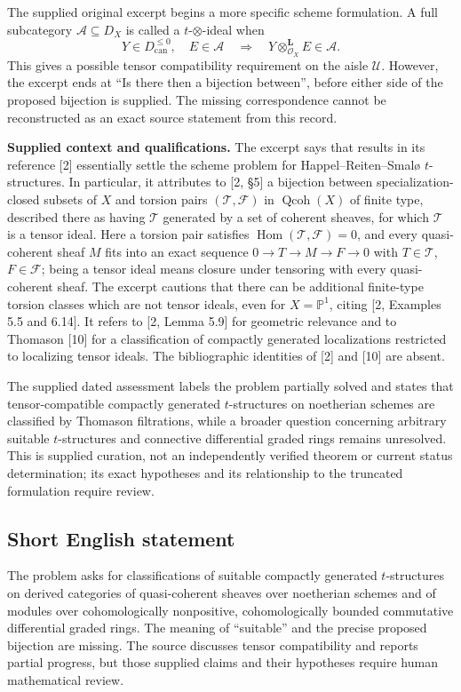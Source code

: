 \documentclass[11pt]{article}
\begin{document}
The supplied original excerpt begins a more specific scheme formulation. A full subcategory \(\mathcal A\subseteq D_X\) is called a \(t\)-\(\otimes\)-ideal when
\[
Y\in D_{\mathrm{can}}^{\leq 0},\quad E\in\mathcal A
\quad\Longrightarrow\quad
Y\otimes_{\mathcal O_X}^{\mathbf L}E\in\mathcal A.
\]
This gives a possible tensor compatibility requirement on the aisle \(\mathcal U\). However, the excerpt ends at ``Is there then a bijection between'', before either side of the proposed bijection is supplied. The missing correspondence cannot be reconstructed as an exact source statement from this record.

\textbf{Supplied context and qualifications.} The excerpt says that results in its reference [2] essentially settle the scheme problem for Happel--Reiten--Smal\o{} \(t\)-structures. In particular, it attributes to [2, \S5] a bijection between specialization-closed subsets of \(X\) and torsion pairs \((\mathcal T,\mathcal F)\) in \(\operatorname{Qcoh}(X)\) of finite type, described there as having \(\mathcal T\) generated by a set of coherent sheaves, for which \(\mathcal T\) is a tensor ideal. Here a torsion pair satisfies \(\operatorname{Hom}(\mathcal T,\mathcal F)=0\), and every quasi-coherent sheaf \(M\) fits into an exact sequence \(0\to T\to M\to F\to0\) with \(T\in\mathcal T\), \(F\in\mathcal F\); being a tensor ideal means closure under tensoring with every quasi-coherent sheaf. The excerpt cautions that there can be additional finite-type torsion classes which are not tensor ideals, even for \(X=\mathbb P^1\), citing [2, Examples 5.5 and 6.14]. It refers to [2, Lemma 5.9] for geometric relevance and to Thomason [10] for a classification of compactly generated localizations restricted to localizing tensor ideals. The bibliographic identities of [2] and [10] are absent.

The supplied dated assessment labels the problem partially solved and states that tensor-compatible compactly generated \(t\)-structures on noetherian schemes are classified by Thomason filtrations, while a broader question concerning arbitrary suitable \(t\)-structures and connective differential graded rings remains unresolved. This is supplied curation, not an independently verified theorem or current status determination; its exact hypotheses and its relationship to the truncated formulation require review.
\subsection{Short English statement}
The problem asks for classifications of suitable compactly generated \(t\)-structures on derived categories of quasi-coherent sheaves over noetherian schemes and of modules over cohomologically nonpositive, cohomologically bounded commutative differential graded rings. The meaning of ``suitable'' and the precise proposed bijection are missing. The source discusses tensor compatibility and reports partial progress, but those supplied claims and their hypotheses require human mathematical review.
\end{document}
